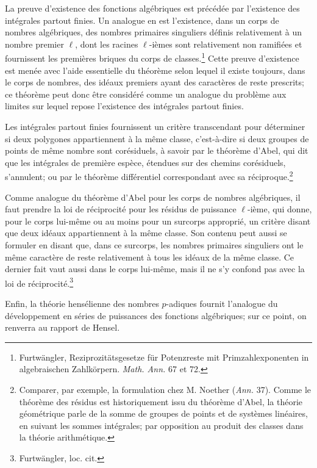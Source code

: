 La preuve d'existence des fonctions algébriques est précédée par l'existence des intégrales partout finies. Un analogue en est l'existence, dans un corps de nombres algébriques, des \og{}nombres primaires singuliers\fg{} définis relativement à un nombre premier \(\ell\), dont les racines \(\ell\)-ièmes sont relativement non ramifiées et fournissent les premières briques du corps de classes.\footnote{Furtwängler, Reziprozitätsgesetze für Potenzreste mit Primzahlexponenten in algebraischen Zahlkörpern. \emph{Math. Ann.} 67 et 72.} Cette preuve d'existence est menée avec l'aide essentielle du théorème selon lequel il existe toujours, dans le corps de nombres, des idéaux premiers ayant des caractères de reste prescrits; ce théorème peut donc être considéré comme un analogue du problème aux limites sur lequel repose l'existence des intégrales partout finies.

Les intégrales partout finies fournissent un critère transcendant pour déterminer si deux polygones appartiennent à la même classe, c'est-à-dire si deux groupes de points de même nombre sont corésiduels, à savoir par le théorème d'Abel, qui dit que les intégrales de première espèce, étendues sur des \og{}chemins corésiduels\fg{}, s'annulent; ou par le théorème différentiel correspondant avec sa réciproque.\footnote{Comparer, par exemple, la formulation chez M. Noether (\emph{Ann.} 37). Comme le théorème des résidus est historiquement issu du théorème d'Abel, la théorie géométrique parle de la \og{}somme\fg{} de groupes de points et de systèmes linéaires, en suivant les sommes intégrales; par opposition au \og{}produit\fg{} des classes dans la théorie arithmétique.}

Comme analogue du théorème d'Abel pour les corps de nombres algébriques, il faut prendre la \og{}loi de réciprocité pour les résidus de puissance \(\ell\)-ième\fg{}, qui donne, pour le corps lui-même ou au moins pour un surcorps approprié, un critère disant que deux idéaux appartiennent à la même classe. Son contenu peut aussi se formuler en disant que, dans ce surcorps, les nombres primaires singuliers ont le même caractère de reste relativement à tous les idéaux de la même classe. Ce dernier fait vaut aussi dans le corps lui-même, mais il ne s'y confond pas avec la loi de réciprocité.\footnote{Furtwängler, loc. cit.}

Enfin, la théorie hensélienne des nombres \(p\)-adiques fournit l'analogue du développement en séries de puissances des fonctions algébriques; sur ce point, on renverra au rapport de Hensel.
